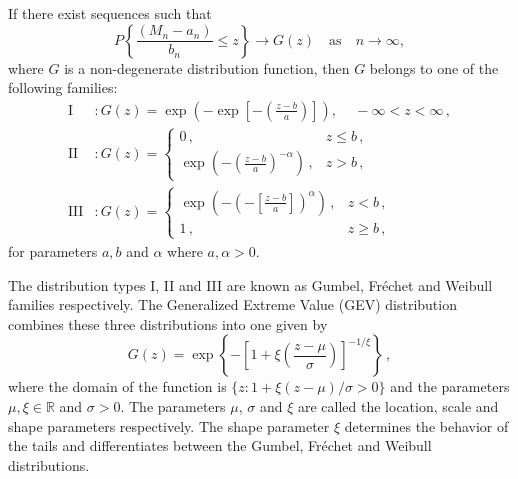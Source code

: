 \begin{theorem} \label{thm:FisherTippett}
If there exist sequences such that 
$$ P\left\{ \frac{(M_n - a_n)}{b_n} \leq z \right\} \rightarrow G(z) \quad \text{as} \quad n \to \infty,
$$
where $G$ is a non-degenerate distribution function, then $G$ belongs to one of the following families:
\begin{align}\label{eq:EVT3}
    \text{I}&: G(z) = \exp\left( -\exp \left[ - \left( \frac{z-b}{a}\right) \right] \right), \, \quad -\infty < z < \infty\, ,  \\
    \text{II}&: G(z) =  \begin{cases}
                                   0\, ,    &  z \leq b \, ,  \\
                                   \exp \left( - \left( \frac{z-b}{a}\right)^{-\alpha} \right)\, ,   & z > b \, , 
                    \end{cases} \\
     \text{III}&: G(z) =  \begin{cases}
                            \exp \left( - \left(- \left[\frac{z-b}{a}\right]\right)^{\alpha} \right)\, ,   & z < b \, , \\
                             1\, ,    &  z \geq b  \, , 
                    \end{cases}                     
\end{align}
 for parameters $a, b$ and $\alpha$ where $a, \alpha >0$.
\end{theorem}
The distribution types I, II and III are known as Gumbel, Fr\'echet and Weibull families respectively. The Generalized Extreme Value (GEV) distribution combines these three distributions into one given by
\begin{equation}\label{eq:EVT4}
    G(z) = \exp\left\{ -\left[ 1 + \xi\left(\frac{z - \mu}{\sigma} \right)\right]^{-1/\xi} \right\}\, , 
\end{equation}
where the domain of the function is $\{z: 1 + \xi (z - \mu)/\sigma >0 \}$ and the parameters $\mu, \xi \in \mathbb{R}$ and $\sigma > 0$.  The parameters $\mu$, $\sigma$ and $\xi$ are called the location, scale and shape parameters respectively. The shape parameter $\xi$ determines the behavior of the tails and differentiates between the Gumbel, Fr\'echet and Weibull distributions.

